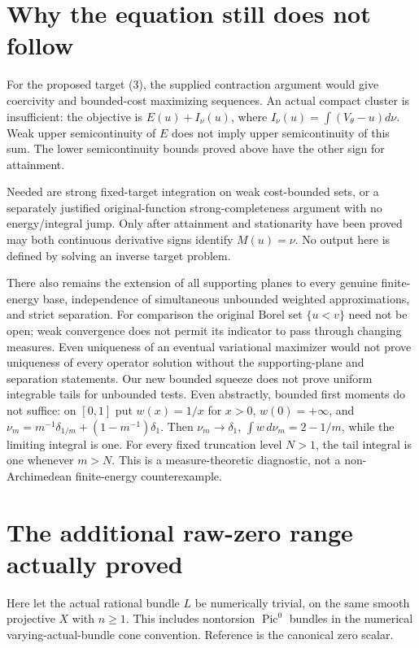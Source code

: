 \documentclass[10pt]{article}
\begin{document}
\section{Why the equation still does not follow}
For the proposed target (3), the supplied contraction argument would give
coercivity and bounded-cost maximizing sequences. An actual compact
cluster is insufficient: the objective is $E(u)+I_\nu(u)$, where
$I_\nu(u)=\int(V_\theta-u)d\nu$. Weak upper semicontinuity of $E$
does not imply upper semicontinuity of this sum. The lower
semicontinuity bounds proved above have the other sign for attainment.

Needed are strong fixed-target integration on weak cost-bounded sets,
or a separately justified original-function strong-completeness
argument with no energy/integral jump. Only after attainment and
stationarity have been proved may both continuous derivative signs
identify $M(u)=\nu$. No output here is defined by solving an inverse
target problem.

There also remains the extension of all supporting planes to every
genuine finite-energy base, independence of simultaneous unbounded
weighted approximations, and strict separation. For comparison the
original Borel set $\{u<v\}$ need not be open; weak convergence does not
permit its indicator to pass through changing measures.
Even uniqueness of an eventual variational maximizer would not prove
uniqueness of every operator solution without the supporting-plane
and separation statements. Our new bounded squeeze does not prove
uniform integrable tails for unbounded tests. Even abstractly, bounded
first moments do not suffice: on $[0,1]$ put $w(x)=1/x$ for $x>0$,
$w(0)=+\infty$, and
$\nu_m=m^{-1}\delta_{1/m}+(1-m^{-1})\delta_1$.
Then $\nu_m\to\delta_1$, $\int w\,d\nu_m=2-1/m$, while the limiting
integral is one. For every fixed truncation level $N>1$, the tail
integral is one whenever $m>N$. This is a measure-theoretic
diagnostic, not a non-Archimedean finite-energy counterexample.

\section{The additional raw-zero range actually proved}\label{zero}
Here let the actual rational bundle $L$ be numerically trivial, on the
same smooth projective $X$ with $n\geq1$. This includes nontorsion
$\operatorname{Pic}^0$ bundles in the numerical varying-actual-bundle
cone convention. Reference is the canonical zero scalar.
\end{document}
